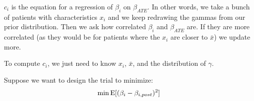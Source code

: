\begin{enumerate}
\begin{enumerate}
				$c_i$ is the equation for a regression of $\beta_i$ on $\beta_{ATE}$. In other words, we take a bunch of patients with characteristics $x_i$ and we keep redrawing the gammas from our prior distribution. Then we ask how correlated  $\beta_i$ and $\beta_{ATE}$ are. If they are more correlated (as they would be for patients where the $x_i$ are closer to $\bar{x}$) we update more.

				To compute $c_i$, we just need to know $x_i$, $\bar{x}$, and the distribution of $\gamma$.

				Suppose we want to design the trial to minimize:
				\begin{align*}
					\min \mathrm{E}[(\beta_i - \beta_{i,post})^2]
				\end{align*} 
		\end{enumerate}

\end{enumerate} 







